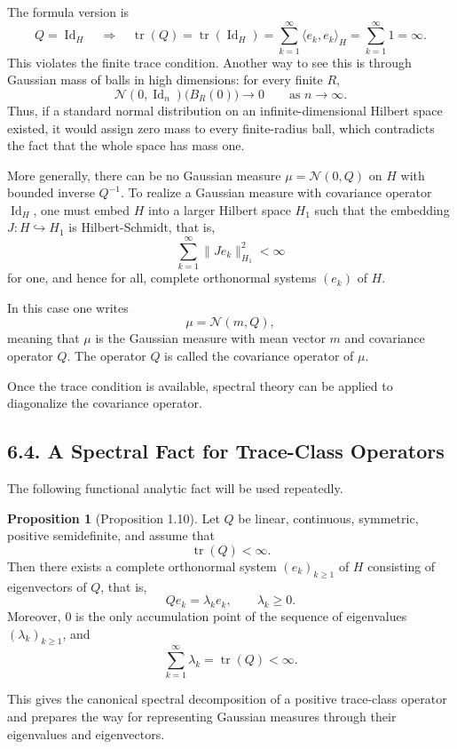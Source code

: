 \documentclass[11pt]{article}
\theoremstyle{definition}
\newtheorem{proposition}{Proposition}
\theoremstyle{remark}
\begin{document}
The formula version is
\[
Q
=
\operatorname{Id}_H
\quad\Longrightarrow\quad
\operatorname{tr}(Q)
=
\operatorname{tr}(\operatorname{Id}_H)
=
\sum_{k=1}^{\infty}\langle e_k,e_k\rangle_H
=
\sum_{k=1}^{\infty}1
=
\infty.
\]
This violates the finite trace condition.
Another way to see this is through Gaussian mass of balls in high dimensions: for every finite $R$,
\[
\mathcal N(0,\operatorname{Id}_n)\bigl(B_R(0)\bigr)\to 0
\qquad \text{as } n\to\infty.
\]
Thus, if a standard normal distribution on an infinite-dimensional Hilbert space existed, it would assign zero mass to every finite-radius ball, which contradicts the fact that the whole space has mass one.

More generally, there can be no Gaussian measure $\mu=\mathcal N(0,Q)$ on $H$ with bounded inverse $Q^{-1}$. To realize a Gaussian measure with covariance operator $\operatorname{Id}_H$, one must embed $H$ into a larger Hilbert space $H_1$ such that the embedding
\(J:H\hookrightarrow H_1\) is Hilbert-Schmidt, that is,
\[
\sum_{k=1}^{\infty}\|Je_k\|_{H_1}^2<\infty
\]
for one, and hence for all, complete orthonormal systems $(e_k)$ of $H$.

In this case one writes
\[
\mu=\mathcal N(m,Q),
\]
meaning that $\mu$ is the Gaussian measure with mean vector $m$ and covariance operator $Q$. The operator $Q$ is called the covariance operator of $\mu$.

Once the trace condition is available, spectral theory can be applied to diagonalize the covariance operator.

\subsection*{6.4. A Spectral Fact for Trace-Class Operators}
The following functional analytic fact will be used repeatedly.

\begin{proposition}[Proposition 1.10]
Let $Q$ be linear, continuous, symmetric, positive semidefinite, and assume that
\[
\operatorname{tr}(Q)<\infty.
\]
Then there exists a complete orthonormal system $(e_k)_{k\ge 1}$ of $H$ consisting of eigenvectors of $Q$, that is,
\[
Qe_k=\lambda_k e_k,
\qquad
\lambda_k\ge 0.
\]
Moreover, $0$ is the only accumulation point of the sequence of eigenvalues $(\lambda_k)_{k\ge 1}$, and
\[
\sum_{k=1}^{\infty}\lambda_k=\operatorname{tr}(Q)<\infty.
\]
\end{proposition}

This gives the canonical spectral decomposition of a positive trace-class operator and prepares the way for representing Gaussian measures through their eigenvalues and eigenvectors.
\end{document}
